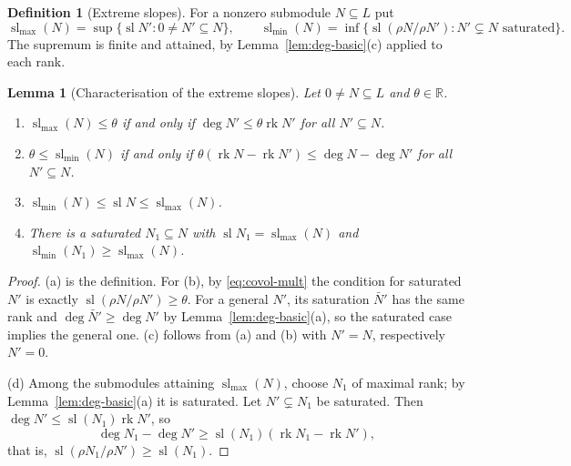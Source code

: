 \documentclass[10pt]{amsart}
\newtheorem{lemma}[theorem]{Lemma}
\theoremstyle{definition}
\newtheorem{definition}[theorem]{Definition}
\theoremstyle{remark}
\newcommand{\R}{\mathbb R}
\begin{document}
\begin{definition}[Extreme slopes]\label{def:extreme}
For a nonzero submodule $N\subseteq L$ put
\[
\operatorname{sl}_{\max}(N)=\sup\{\operatorname{sl}N':0\neq N'\subseteq N\},\qquad \operatorname{sl}_{\min}(N)=\inf\{\operatorname{sl}(\rho N/\rho N'):N'\subsetneq N\text{ saturated}\}.
\]
The supremum is finite and attained, by Lemma~\ref{lem:deg-basic}(c) applied to each rank.
\end{definition}

\begin{lemma}[Characterisation of the extreme slopes]\label{lem:muchar}
Let $0\ne N\subseteq L$ and $\theta\in\R$.
\begin{enumerate}
\item[(a)] $\operatorname{sl}_{\max}(N)\le\theta$ if and only if $\deg N'\le\theta\operatorname{rk}N'$ for all $N'\subseteq N$.
\item[(b)] $\theta\le\operatorname{sl}_{\min}(N)$ if and only if $\theta(\operatorname{rk}N-\operatorname{rk}N')\le\deg N-\deg N'$ for all $N'\subseteq N$.
\item[(c)] $\operatorname{sl}_{\min}(N)\le\operatorname{sl}N\le\operatorname{sl}_{\max}(N)$.
\item[(d)] There is a saturated $N_1\subseteq N$ with $\operatorname{sl}N_1=\operatorname{sl}_{\max}(N)$ and $\operatorname{sl}_{\min}(N_1)\ge\operatorname{sl}_{\max}(N)$.
\end{enumerate}
\end{lemma}
\begin{proof}
(a) is the definition. For (b), by \eqref{eq:covol-mult} the condition for saturated $N'$ is exactly $\operatorname{sl}(\rho N/\rho N')\ge\theta$. For a general $N'$, its saturation $\bar N'$ has the same rank and $\deg\bar N'\ge\deg N'$ by Lemma~\ref{lem:deg-basic}(a), so the saturated case implies the general one. (c) follows from (a) and (b) with $N'=N$, respectively $N'=0$.

(d) Among the submodules attaining $\operatorname{sl}_{\max}(N)$, choose $N_1$ of maximal rank; by Lemma~\ref{lem:deg-basic}(a) it is saturated. Let $N'\subsetneq N_1$ be saturated. Then $\deg N'\le\operatorname{sl}(N_1)\operatorname{rk}N'$, so
\[
\deg N_1-\deg N'\ge\operatorname{sl}(N_1)(\operatorname{rk}N_1-\operatorname{rk}N'),
\]
that is, $\operatorname{sl}(\rho N_1/\rho N')\ge\operatorname{sl}(N_1)$.
\end{proof}
\end{document}
